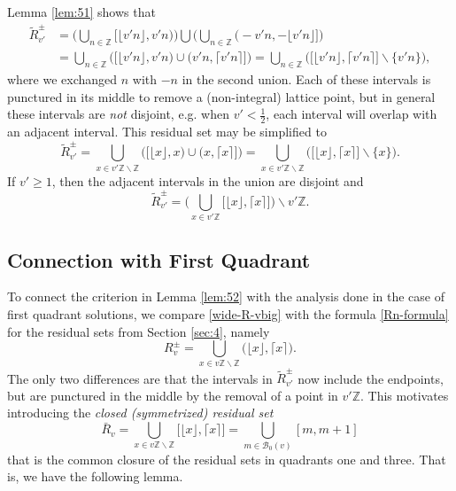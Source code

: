 \documentclass[12pt,letterpaper, reqno]{amsart}
\theoremstyle{definition}
\theoremstyle{remark}
\newcommand{\ZZ}{\ensuremath{\mathbb{Z}}}
\newcommand{\vv}{{v'}}
\newcommand{\R}{{R}}
\newcommand{\sB}{{\mathcal B}}
\newcommand{\floor}[1]{\lfloor{#1}\rfloor}
\newcommand{\ceil}[1]{\lceil{#1}\rceil}
\begin{document}
Lemma \ref{lem:51}  shows that 
\begin{align*}
\widetilde{\R}^\pm_\vv &=\bigg( \bigcup_{n\in\ZZ} \big[\floor{{\vv }n},\vv n \big) \bigg) \bigcup 
\bigg(\bigcup_{n\in\ZZ}\big(-\vv n, -\floor{{\vv} n} \big]\bigg)\\
&= \bigcup_{n\in\ZZ}\bigg( \big[\floor{{\vv }n},\vv n \big) \cup \big(\vv n,\ceil{\vv n} \big] \bigg)
= \bigcup_{n\in\ZZ}\bigg( \big[\floor{{\vv }n},\ceil{\vv n} \big] \smallsetminus\{\vv n\}\bigg),
\end{align*}
where we exchanged $n$ with $-n$ in the second union.  
Each of  these intervals is punctured in its middle to remove a (non-integral) lattice point, but in general these intervals are {\em not} disjoint, e.g. when $\vv < \frac12$, each interval will  overlap with an adjacent interval.
This residual set may be simplified to
\begin{equation}\label{wide-R}
\widetilde{\R}^\pm_\vv = \bigcup_{x\in {\vv}\ZZ \smallsetminus\ZZ} \bigg(\big[ \floor{x},x\big)\cup \big(x, \ceil{x}\big] \bigg) 
= \bigcup_{x\in {\vv}\ZZ \smallsetminus\ZZ} \bigg(\big[ \floor{x}, \ceil{x}\big] \smallsetminus\{x\} \bigg).
\end{equation}
If $\vv\geq 1$, then the adjacent intervals in the union are disjoint and
\begin{equation}\label{wide-R-vbig}
\widetilde{\R}^\pm_\vv =\bigg( \bigcup_{x\in {\vv}\ZZ}\big[ \floor{x}, \ceil{x}\big] \bigg) \smallsetminus \vv\ZZ.
\end{equation}

%
%
\subsection{Connection with First Quadrant}\label{sec52}
To connect the criterion in Lemma \ref{lem:52} 
with the analysis done in the case of first quadrant solutions, 
we compare \eqref{wide-R-vbig}  with the formula \eqref{Rn-formula} for the residual sets from Section \ref{sec:4}, namely
  \[
 R_{v}^{\pm} = \bigcup_{x\in v\ZZ \smallsetminus \ZZ} \big(\floor{x},\ceil{x} \big) .
\]
The only two  differences are that the intervals in $\widetilde{R}^\pm_{\vv}$ now include the endpoints,  but are  punctured in the middle by the removal of a point in $\vv\ZZ$. This motivates introducing the {\em closed (symmetrized) residual set} 
\[ \bar{R}_v = \bigcup_{x\in v\ZZ \smallsetminus\ZZ} \big[ \floor{x},\ceil{x} \big] = \bigcup_{m\in \sB_0(v)} [m,m+1] \]
that is the common closure of the residual sets in quadrants one and three. That is, we have the following lemma.
\end{document}
